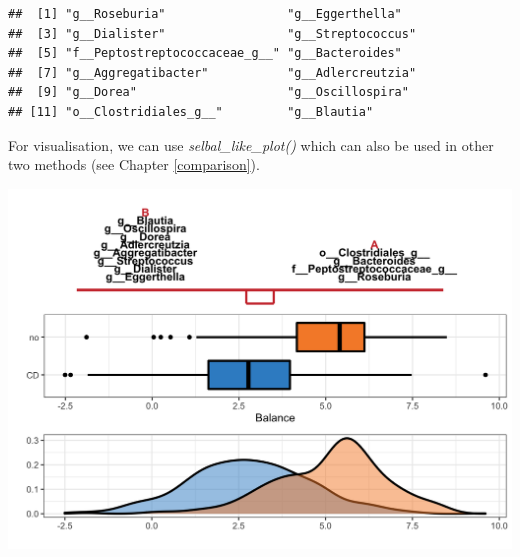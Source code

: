 \documentclass[openany]{book}
\newenvironment{Shaded}{\begin{snugshade}}{\end{snugshade}}
\newcommand{\KeywordTok}[1]{\textcolor[rgb]{0.13,0.29,0.53}{\textbf{#1}}}
\newcommand{\DataTypeTok}[1]{\textcolor[rgb]{0.13,0.29,0.53}{#1}}
\newcommand{\StringTok}[1]{\textcolor[rgb]{0.31,0.60,0.02}{#1}}
\newcommand{\OtherTok}[1]{\textcolor[rgb]{0.56,0.35,0.01}{#1}}
\newcommand{\OperatorTok}[1]{\textcolor[rgb]{0.81,0.36,0.00}{\textbf{#1}}}
\newcommand{\NormalTok}[1]{#1}
\begin{document}
\begin{Shaded}
\end{Shaded}

\begin{verbatim}
##  [1] "g__Roseburia"                 "g__Eggerthella"              
##  [3] "g__Dialister"                 "g__Streptococcus"            
##  [5] "f__Peptostreptococcaceae_g__" "g__Bacteroides"              
##  [7] "g__Aggregatibacter"           "g__Adlercreutzia"            
##  [9] "g__Dorea"                     "g__Oscillospira"             
## [11] "o__Clostridiales_g__"         "g__Blautia"
\end{verbatim}

For visualisation, we can use \emph{selbal\_like\_plot()} which can also
be used in other two methods (see Chapter \ref{comparison}).

\begin{Shaded}
\end{Shaded}

\begin{center}\includegraphics[width=1\linewidth]{./Generated_plots/unnamed-chunk-18-1} \end{center}
\end{document}
